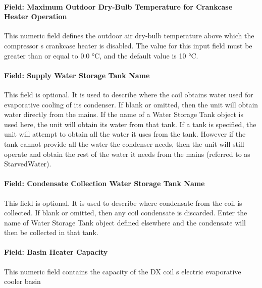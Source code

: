 \paragraph{Field: Maximum Outdoor Dry-Bulb Temperature for Crankcase Heater Operation}\label{field-maximum-outdoor-dry-bulb-temperature-for-crankcase-heater-operation-3}

This numeric field defines the outdoor air dry-bulb temperature above which the compressor s crankcase heater is disabled. The value for this input field must be greater than or equal to 0.0 °C, and the default value is 10 °C.

\paragraph{Field: Supply Water Storage Tank Name}\label{field-supply-water-storage-tank-name-4-000}

This field is optional. It is used to describe where the coil obtains water used for evaporative cooling of its condenser. If blank or omitted, then the unit will obtain water directly from the mains. If the name of a Water Storage Tank object is used here, the unit will obtain its water from that tank. If a tank is specified, the unit will attempt to obtain all the water it uses from the tank. However if the tank cannot provide all the water the condenser needs, then the unit will still operate and obtain the rest of the water it needs from the mains (referred to as StarvedWater).

\paragraph{Field: Condensate Collection Water Storage Tank Name}\label{field-condensate-collection-water-storage-tank-name-6}

This field is optional. It is used to describe where condensate from the coil is collected. If blank or omitted, then any coil condensate is discarded. Enter the name of Water Storage Tank object defined elsewhere and the condensate will then be collected in that tank.

\paragraph{Field: Basin Heater Capacity}\label{field-basin-heater-capacity-4}

This numeric field contains the capacity of the DX coil s electric evaporative cooler basin

